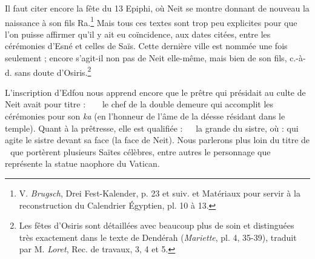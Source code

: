 \documentclass[a4paper, 11pt, oneside]{article}
\newcommand*\hieroAABA{}
\newcommand*\hieroAACS{}
\newcommand*\hieroAACY{}
\newcommand*\hieroAAHK{}
\newcommand*\hieroAANP{}
\newcommand*\hieroAAOR{}
\newcommand*\hieroAAOS{}
\newcommand*\hieroAAOT{}
\newcommand*\hieroAAOU{}
\newcommand*\hieroAAOV{}
\newcommand*\hieroAAOW{}
\newcommand*\hieroAAOX{}
\newcommand*\hieroAAOY{\raisebox{0.3ex}{}}
\begin{document}
Il faut citer encore la fête du 13 Epiphi, où Neit se montre donnant de nouveau la naissance à son fils Ra.\footnote{V. \emph{Brugsch}, Drei Fest-Kalender, p. 23 et suiv. et Matériaux pour servir à la reconstruction du Calendrier Égyptien, pl. 10 à 13.} Mais tous ces textes sont trop peu explicites pour que l'on puisse affirmer qu'il y ait eu coïncidence, aux dates citées, entre les cérémonies d'Esné et celles de Saïs. Cette dernière ville est nommée une fois seulement ; encore s'agit-il non pas de Neit elle-même, mais bien de son fils, c.-à-d. sans doute d'Osiris.\footnote{Les fêtes d'Osiris sont détaillées avec beaucoup plus de soin et distinguées très exactement dans le texte de Dendérah (\emph{Mariette}, pl. 4, 35-39), traduit par M. \emph{Loret}, Rec. de travaux, 3, 4 et 5.}

L'inscription d'Edfou nous apprend encore que le prêtre qui présidait au culte de Neit avait pour titre : $\hieroAAHK\:\hieroAAOR\:\hieroAAHK\allowbreak\:\hieroAAOS\:\hieroAAOT\allowbreak\:\hieroAAOU\:\hieroAACS$ le chef de la double demeure qui accomplit les cérémonies pour son \emph{ka} (en l'honneur de l'âme de la déesse résidant dans le temple). Quant à la prêtresse, elle est qualifiée : $\hieroAABA\:\hieroAACY\:\hieroAAOV\allowbreak\:\hieroAANP\:\hieroAAOW$ la grande du sistre, où : qui agite le sistre devant sa face (la face de Neit). Nous parlerons plus loin du titre de $\hieroAAOX\:\hieroAAOY$ que portèrent plusieurs Saïtes célèbres, entre autres le personnage que représente la statue naophore du Vatican.
\end{document}
